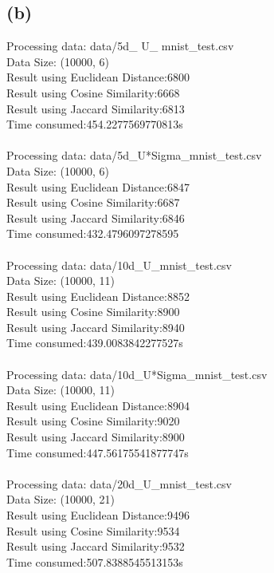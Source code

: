 \documentclass[a4paper]{article}
\begin{document}
\subsection{(b)}
Processing data: data/5d\_ U\_ mnist\_test.csv
\\Data Size: (10000, 6)
\\Result using Euclidean Distance:6800
\\Result using Cosine Similarity:6668
\\Result using Jaccard Similarity:6813
\\Time consumed:454.2277569770813s
\\
\\Processing data: data/5d\_U*Sigma\_mnist\_test.csv
\\Data Size: (10000, 6)
\\Result using Euclidean Distance:6847
\\Result using Cosine Similarity:6687
\\Result using Jaccard Similarity:6846
\\Time consumed:432.4796097278595
\\
\\Processing data: data/10d\_U\_mnist\_test.csv
\\Data Size: (10000, 11)
\\Result using Euclidean Distance:8852
\\Result using Cosine Similarity:8900
\\Result using Jaccard Similarity:8940
\\Time consumed:439.0083842277527s
\\
\\Processing data: data/10d\_U*Sigma\_mnist\_test.csv
\\Data Size: (10000, 11)
\\Result using Euclidean Distance:8904
\\Result using Cosine Similarity:9020
\\Result using Jaccard Similarity:8900
\\Time consumed:447.56175541877747s
\\
\\Processing data: data/20d\_U\_mnist\_test.csv
\\Data Size: (10000, 21)
\\Result using Euclidean Distance:9496
\\Result using Cosine Similarity:9534
\\Result using Jaccard Similarity:9532
\\Time consumed:507.8388545513153s
\end{document}
